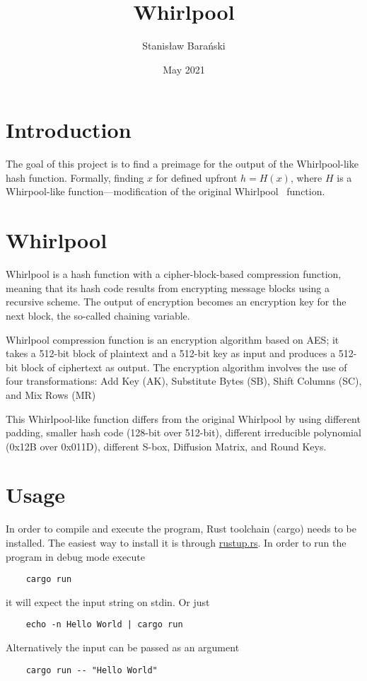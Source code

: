 \documentclass[runningheads,a4paper]{llncs}
\title{Whirlpool}
\author{Stanisław Barański}
\date{May 2021}
\institute{Podstawy kryptografi}
\begin{document}
\maketitle

\section{Introduction}

The goal of this project is to find a preimage for the output of the Whirlpool-like hash function. Formally, finding $x$ for defined upfront $h=H(x)$, where $H$ is a Whirpool-like function—modification of the original Whirlpool~\cite{stallings2006whirlpool} function.

\section{Whirlpool}

Whirlpool is a hash function with a cipher-block-based compression function, meaning that its hash code results from encrypting message blocks using a recursive scheme. The output of encryption becomes an encryption key for the next block, the so-called chaining variable.

Whirlpool compression function is an encryption algorithm based on AES; it takes a 512-bit block of plaintext and a 512-bit key as input and produces a 512-bit block of ciphertext as output. The encryption algorithm involves the use of four transformations: Add Key (AK), Substitute Bytes (SB), Shift Columns (SC), and Mix Rows (MR)

This Whirlpool-like function differs from the original Whirlpool by using different padding, smaller hash code (128-bit over 512-bit), different irreducible polynomial (0x12B over 0x011D), different S-box, Diffusion Matrix, and Round Keys.

\section{Usage}

In order to compile and execute the program, Rust toolchain (cargo) needs to be installed. The easiest way to install it is through \href{https://rustup.rs/}{rustup.rs}. In order to run the program in debug mode execute
\begin{verbatim}
    cargo run
\end{verbatim}
it will expect the input string on stdin. Or just
\begin{verbatim}
    echo -n Hello World | cargo run
\end{verbatim}
Alternatively the input can be passed as an argument
\begin{verbatim}
    cargo run -- "Hello World"
\end{verbatim}
\end{document}
